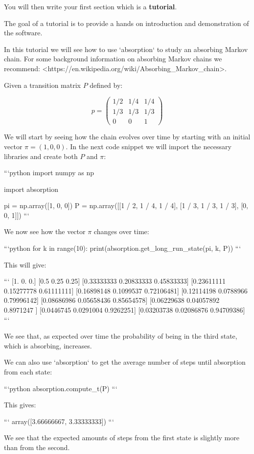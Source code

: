 You will then write your first section which is a \textbf{tutorial}.

\begin{note}
The goal of a tutorial is to provide a hands on introduction and demonstration
of the software.
\end{note}

\begin{md}

In this tutorial we will see how to use `absorption` to study an absorbing
Markov chain. For some background information on absorbing Markov chains we
recommend: <https://en.wikipedia.org/wiki/Absorbing_Markov_chain>.

Given a transition matrix $P$ defined by:

$$
p = \begin{pmatrix}
   1/2 & 1/4 & 1/4\\
   1/3 & 1/3 & 1/3\\
   0   & 0   & 1
    \end{pmatrix}
$$

We will start by seeing how the chain evolves over time by starting with an
initial vector $\pi=(1,0,0)$. In the next code snippet we will import the
necessary libraries and create both $P$ and $\pi$:

```python
import numpy as np

import absorption

pi = np.array([1, 0, 0])
P = np.array([[1 / 2, 1 / 4, 1 / 4], [1 / 3, 1 / 3, 1 / 3], [0, 0, 1]])
```

We now see how the vector $\pi$ changes over time:

```python
for k in range(10):
    print(absorption.get_long_run_state(pi, k, P))
```

This will give:

```
[1. 0. 0.]
[0.5  0.25 0.25]
[0.33333333 0.20833333 0.45833333]
[0.23611111 0.15277778 0.61111111]
[0.16898148 0.1099537  0.72106481]
[0.12114198 0.0788966  0.79996142]
[0.08686986 0.05658436 0.85654578]
[0.06229638 0.04057892 0.8971247 ]
[0.0446745 0.0291004 0.9262251]
[0.03203738 0.02086876 0.94709386]
```

We see that, as expected over time the probability of being in the third state,
which is absorbing, increases.

We can also use `absorption` to get the average number of steps until
absorption from each state:

```python
absorption.compute_t(P)
```

This gives:

```
array([3.66666667, 3.33333333])
```

We see that the expected amounts of steps from the first state is slightly more
than from the second.
\end{md}

